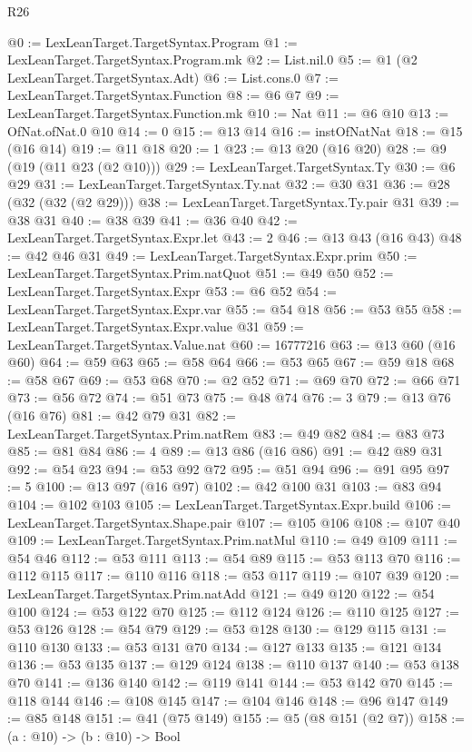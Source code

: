 \begin{lexlean}{R26}
\begin{coremodule}
@0 := LexLeanTarget.TargetSyntax.Program
@1 := LexLeanTarget.TargetSyntax.Program.mk
@2 := List.nil.{0}
@5 := @1 (@2 LexLeanTarget.TargetSyntax.Adt)
@6 := List.cons.{0}
@7 := LexLeanTarget.TargetSyntax.Function
@8 := @6 @7
@9 := LexLeanTarget.TargetSyntax.Function.mk
@10 := Nat
@11 := @6 @10
@13 := OfNat.ofNat.{0} @10
@14 := 0
@15 := @13 @14
@16 := instOfNatNat
@18 := @15 (@16 @14)
@19 := @11 @18
@20 := 1
@23 := @13 @20 (@16 @20)
@28 := @9 (@19 (@11 @23 (@2 @10)))
@29 := LexLeanTarget.TargetSyntax.Ty
@30 := @6 @29
@31 := LexLeanTarget.TargetSyntax.Ty.nat
@32 := @30 @31
@36 := @28 (@32 (@32 (@2 @29)))
@38 := LexLeanTarget.TargetSyntax.Ty.pair @31
@39 := @38 @31
@40 := @38 @39
@41 := @36 @40
@42 := LexLeanTarget.TargetSyntax.Expr.let
@43 := 2
@46 := @13 @43 (@16 @43)
@48 := @42 @46 @31
@49 := LexLeanTarget.TargetSyntax.Expr.prim
@50 := LexLeanTarget.TargetSyntax.Prim.natQuot
@51 := @49 @50
@52 := LexLeanTarget.TargetSyntax.Expr
@53 := @6 @52
@54 := LexLeanTarget.TargetSyntax.Expr.var
@55 := @54 @18
@56 := @53 @55
@58 := LexLeanTarget.TargetSyntax.Expr.value @31
@59 := LexLeanTarget.TargetSyntax.Value.nat
@60 := 16777216
@63 := @13 @60 (@16 @60)
@64 := @59 @63
@65 := @58 @64
@66 := @53 @65
@67 := @59 @18
@68 := @58 @67
@69 := @53 @68
@70 := @2 @52
@71 := @69 @70
@72 := @66 @71
@73 := @56 @72
@74 := @51 @73
@75 := @48 @74
@76 := 3
@79 := @13 @76 (@16 @76)
@81 := @42 @79 @31
@82 := LexLeanTarget.TargetSyntax.Prim.natRem
@83 := @49 @82
@84 := @83 @73
@85 := @81 @84
@86 := 4
@89 := @13 @86 (@16 @86)
@91 := @42 @89 @31
@92 := @54 @23
@94 := @53 @92 @72
@95 := @51 @94
@96 := @91 @95
@97 := 5
@100 := @13 @97 (@16 @97)
@102 := @42 @100 @31
@103 := @83 @94
@104 := @102 @103
@105 := LexLeanTarget.TargetSyntax.Expr.build
@106 := LexLeanTarget.TargetSyntax.Shape.pair
@107 := @105 @106
@108 := @107 @40
@109 := LexLeanTarget.TargetSyntax.Prim.natMul
@110 := @49 @109
@111 := @54 @46
@112 := @53 @111
@113 := @54 @89
@115 := @53 @113 @70
@116 := @112 @115
@117 := @110 @116
@118 := @53 @117
@119 := @107 @39
@120 := LexLeanTarget.TargetSyntax.Prim.natAdd
@121 := @49 @120
@122 := @54 @100
@124 := @53 @122 @70
@125 := @112 @124
@126 := @110 @125
@127 := @53 @126
@128 := @54 @79
@129 := @53 @128
@130 := @129 @115
@131 := @110 @130
@133 := @53 @131 @70
@134 := @127 @133
@135 := @121 @134
@136 := @53 @135
@137 := @129 @124
@138 := @110 @137
@140 := @53 @138 @70
@141 := @136 @140
@142 := @119 @141
@144 := @53 @142 @70
@145 := @118 @144
@146 := @108 @145
@147 := @104 @146
@148 := @96 @147
@149 := @85 @148
@151 := @41 (@75 @149)
@155 := @5 (@8 @151 (@2 @7))
@158 := (a : @10) -> (b : @10) -> Bool

\end{coremodule}
\end{lexlean}
